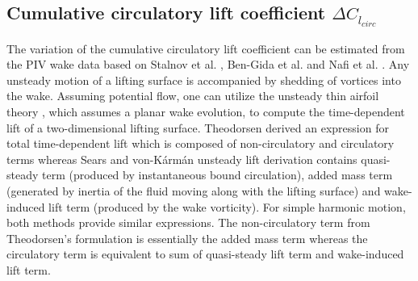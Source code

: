 \documentclass[12pt,a4paper]{article}
\begin{document}
\newpage
\subsection{Cumulative circulatory lift coefficient $\Delta C_{l_{circ}}$}\label{dCl_calc}
The variation of the cumulative circulatory lift coefficient can be estimated from the PIV wake data based on Stalnov et al. \cite{Stalnov2015}, Ben-Gida et al. \cite{BenGida2016} and Nafi et al. \cite{Nafi2020}.
Any unsteady motion of a lifting surface is accompanied by shedding of vortices into the wake. Assuming potential flow, one can utilize the unsteady thin airfoil theory \cite{Theodorsen1935,Sears1938}, which assumes a planar wake evolution, to compute the time-dependent lift of a two-dimensional lifting surface.
Theodorsen \cite{Theodorsen1935} derived an expression for total time-dependent lift which is composed of non-circulatory and circulatory terms whereas Sears and von-K\'{a}rm\'{a}n \cite{Sears1938} unsteady lift derivation contains quasi-steady term (produced by instantaneous bound circulation), added mass term (generated by inertia of the fluid moving along with the lifting surface) and wake-induced lift term (produced by the wake vorticity). For simple harmonic motion, both methods provide similar expressions. 
The non-circulatory term from Theodorsen's \cite{Theodorsen1935} formulation is essentially the added mass term whereas the circulatory term is equivalent to sum of quasi-steady lift term and wake-induced lift term. 
\end{document}
